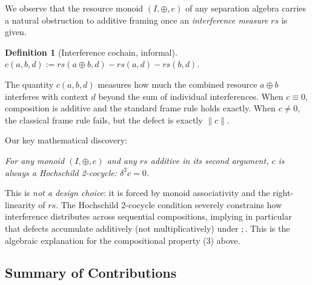 \documentclass[acmsmall,sigplan,anonymous,review,screen]{acmart}
\theoremstyle{plain}
\theoremstyle{definition}
\newtheorem{definition}[theorem]{Definition}
\newcommand{\rs}{\mathit{rs}}
\newcommand{\norm}[1]{\|#1\|}
\begin{document}
We observe that the resource monoid $(I, \oplus, e)$ of any separation
algebra carries a natural obstruction to additive framing once an
\emph{interference measure} $\rs$ is given.

\begin{definition}[Interference cochain, informal]
  $c(a, b, d) := \rs(a \oplus b, d) - \rs(a, d) - \rs(b, d)$.
\end{definition}

The quantity $c(a, b, d)$ measures how much the combined resource $a
\oplus b$ interferes with context $d$ beyond the sum of individual
interferences.  When $c \equiv 0$, composition is additive and the
standard frame rule holds exactly.  When $c \neq 0$, the classical frame
rule fails, but the defect is exactly $\norm{c}$.

Our key mathematical discovery:
\begin{center}
  \emph{For any monoid $(I, \oplus, e)$ and any $\rs$ additive in its
  second argument, $c$ is always a Hochschild 2-cocycle: $\delta^2 c = 0$.}
\end{center}
This is \emph{not a design choice}: it is forced by monoid associativity
and the right-linearity of $\rs$.  The Hochschild 2-cocycle condition
severely constrains how interference distributes across sequential
compositions, implying in particular that defects accumulate additively
(not multiplicatively) under $;$.  This is the algebraic explanation for
the compositional property (3) above.

\subsection{Summary of Contributions}
\label{sec:intro:contributions}
\end{document}
